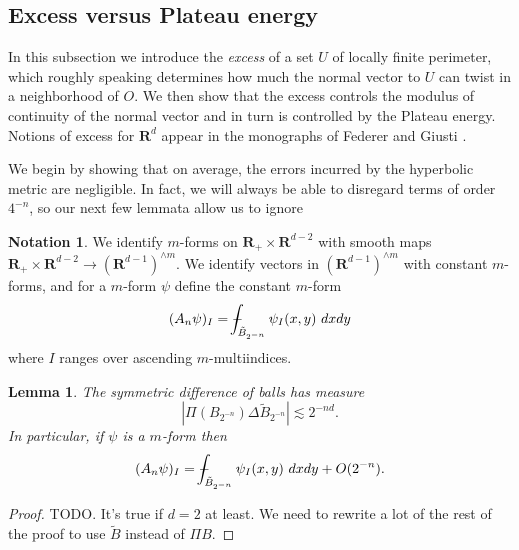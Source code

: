 \documentclass[reqno,12pt,letterpaper]{amsart}
\newcommand{\RR}{\mathbf{R}}
\newcommand{\dfn}[1]{\emph{#1}\index{#1}}
\newtheorem{lemma}[theorem]{Lemma}
\theoremstyle{definition}
\newtheorem{notation}[theorem]{Notation}
\numberwithin{equation}{section}
\def\Xint#1{\mathchoice
{\XXint\displaystyle\textstyle{#1}}%
{\XXint\textstyle\scriptstyle{#1}}%
{\XXint\scriptstyle\scriptscriptstyle{#1}}%
{\XXint\scriptscriptstyle\scriptscriptstyle{#1}}%
\!\int}
\def\XXint#1#2#3{{\setbox0=\hbox{$#1{#2#3}{\int}$ }
\vcenter{\hbox{$#2#3$ }}\kern-.6\wd0}}
\def\dashint{\Xint-}
\begin{document}

\subsection{Excess versus Plateau energy}
In this subsection we introduce the \dfn{excess} of a set $U$ of locally finite perimeter, which roughly speaking determines how much the normal vector to $U$ can twist in a neighborhood of $O$.
We then show that the excess controls the modulus of continuity of the normal vector and in turn is controlled by the Plateau energy.
Notions of excess for $\RR^d$ appear in the monographs of Federer \cite[\S5.3.1]{federer2014geometric} and Giusti \cite[Chapter 6]{Giusti77}.

We begin by showing that on average, the errors incurred by the hyperbolic metric are negligible.
In fact, we will always be able to disregard terms of order $4^{-n}$, so our next few lemmata allow us to ignore

\begin{notation}
We identify $m$-forms on $\RR_+ \times \RR^{d - 2}$ with smooth maps $\RR_+ \times \RR^{d - 2} \to (\RR^{d - 1})^{\wedge m}$.
We identify vectors in $(\RR^{d - 1})^{\wedge m}$ with constant $m$-forms, and for a $m$-form $\psi$ define the constant $m$-form
$$(A_n \psi)_I = \dashint_{\tilde B_{2^{-n}}} \psi_I(x, y) ~dxdy$$
where $I$ ranges over ascending $m$-multiindices.
\end{notation}

\begin{lemma}\label{ball difference is harmless}
The symmetric difference of balls has measure
$$|\Pi(B_{2^{-n}}) \Delta \tilde B_{2^{-n}}| \lesssim 2^{-nd}.$$
In particular, if $\psi$ is a $m$-form then
$$(A_n \psi)_I = \dashint_{\tilde B_{2^{-n}}} \psi_I(x, y) ~dxdy + O(2^{-n}).$$
\end{lemma}
\begin{proof}
TODO. It's true if $d = 2$ at least. We need to rewrite a lot of the rest of the proof to use $\tilde B$ instead of $\Pi B$.
\end{proof}
\end{document}
